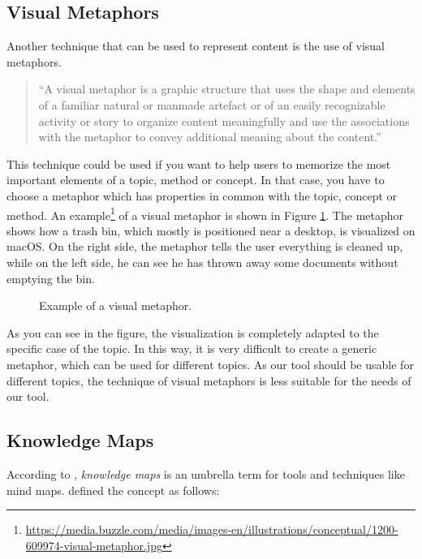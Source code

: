 \subsection{Visual Metaphors}\label{sec:visual-metaphors}
Another technique that can be used to represent content is the use of visual metaphors.

\begin{quote}
``A visual metaphor is a graphic structure that uses the shape and elements of a familiar natural or manmade artefact or of an easily recognizable activity or story to organize content meaningfully and use the associations with the metaphor to convey additional meaning about the content.'' \hfill \citep{eppler-2006}
\end{quote}

This technique could be used if you want to help users to memorize the most important elements of a topic, method or concept. In that case, you have to choose a metaphor which has properties in common with the topic, concept or method. \citep{eppler-2006} An example\footnote{\url{https://media.buzzle.com/media/images-en/illustrations/conceptual/1200-609974-visual-metaphor.jpg}} of a visual metaphor is shown in Figure \ref{fig:visual-metaphor}. The metaphor shows how a trash bin, which mostly is positioned near a desktop, is visualized on macOS. On the right side, the metaphor tells the user everything is cleaned up, while on the left side, he can see he has thrown away some documents without emptying the bin.

\begin{figure}[H]
	\centering
	\caption{Example of a visual metaphor.}
	\label{fig:visual-metaphor}
\end{figure}

As you can see in the figure, the visualization is completely adapted to the specific case of the topic. In this way, it is very difficult to create a generic metaphor, which can be used for different topics. As our tool should be usable for different topics, the technique of visual metaphors is less suitable for the needs of our tool.


\subsection{Knowledge Maps}\label{sec:knowledge-maps}
According to \cite{knowledgemapsbalaid}, \textit{knowledge maps} is an umbrella term for tools and techniques like mind maps. \cite{knowledgemapsodonnell} defined the concept as follows:

